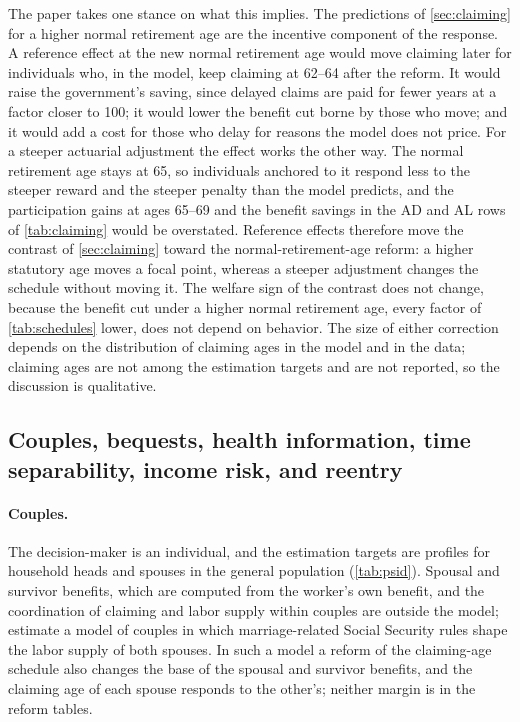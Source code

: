 The paper takes one stance on what this implies. The predictions of \autoref{sec:claiming} for a higher normal retirement age are the incentive component of the response. A reference effect at the new normal retirement age would move claiming later for individuals who, in the model, keep claiming at 62--64 after the reform. It would raise the government's saving, since delayed claims are paid for fewer years at a factor closer to 100; it would lower the benefit cut borne by those who move; and it would add a cost for those who delay for reasons the model does not price. For a steeper actuarial adjustment the effect works the other way. The normal retirement age stays at 65, so individuals anchored to it respond less to the steeper reward and the steeper penalty than the model predicts, and the participation gains at ages 65--69 and the benefit savings in the AD and AL rows of \autoref{tab:claiming} would be overstated. Reference effects therefore move the contrast of \autoref{sec:claiming} toward the normal-retirement-age reform: a higher statutory age moves a focal point, whereas a steeper adjustment changes the schedule without moving it. The welfare sign of the contrast does not change, because the benefit cut under a higher normal retirement age, every factor of \autoref{tab:schedules} lower, does not depend on behavior. %
The size of either correction depends on the distribution of claiming ages in the model and in the data; claiming ages are not among the estimation targets and are not reported, so the discussion is qualitative.



\subsection{Couples, bequests, health information, time separability, income risk, and reentry}\label{subsec:restrictions}

\paragraph{Couples.}
The decision-maker is an individual, and the estimation targets are profiles for household heads and spouses in the general population (\autoref{tab:psid}). %
Spousal and survivor benefits, which are computed from the worker's own benefit, and the coordination of claiming and labor supply within couples are outside the model; \citet{Borella2023} estimate a model of couples in which marriage-related Social Security rules shape the labor supply of both spouses. In such a model a reform of the claiming-age schedule also changes the base of the spousal and survivor benefits, and the claiming age of each spouse responds to the other's; neither margin is in the reform tables.


